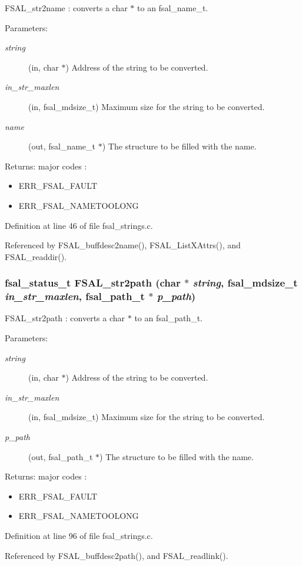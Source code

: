 FSAL\_\-str2name : converts a char $\ast$ to an fsal\_\-name\_\-t.

\begin{Desc}
\item[Parameters:]
\begin{description}
\item[{\em string}](in, char $\ast$) Address of the string to be converted. \item[{\em in\_\-str\_\-maxlen}](in, fsal\_\-mdsize\_\-t) Maximum size for the string to be converted. \item[{\em name}](out, fsal\_\-name\_\-t $\ast$) The structure to be filled with the name.\end{description}
\end{Desc}
\begin{Desc}
\item[Returns:]major codes :\begin{itemize}
\item ERR\_\-FSAL\_\-FAULT\item ERR\_\-FSAL\_\-NAMETOOLONG \end{itemize}
\end{Desc}


Definition at line 46 of file fsal\_\-strings.c.

Referenced by FSAL\_\-buffdesc2name(), FSAL\_\-List\-XAttrs(), and FSAL\_\-readdir().
\subsubsection{\setlength{\rightskip}{0pt plus 5cm}fsal\_\-status\_\-t FSAL\_\-str2path (char $\ast$ {\em string}, fsal\_\-mdsize\_\-t {\em in\_\-str\_\-maxlen}, fsal\_\-path\_\-t $\ast$ {\em p\_\-path})}\label{group__FSALNameFunctions_ga1}


FSAL\_\-str2path : converts a char $\ast$ to an fsal\_\-path\_\-t.

\begin{Desc}
\item[Parameters:]
\begin{description}
\item[{\em string}](in, char $\ast$) Address of the string to be converted. \item[{\em in\_\-str\_\-maxlen}](in, fsal\_\-mdsize\_\-t) Maximum size for the string to be converted. \item[{\em p\_\-path}](out, fsal\_\-path\_\-t $\ast$) The structure to be filled with the name.\end{description}
\end{Desc}
\begin{Desc}
\item[Returns:]major codes :\begin{itemize}
\item ERR\_\-FSAL\_\-FAULT\item ERR\_\-FSAL\_\-NAMETOOLONG \end{itemize}
\end{Desc}


Definition at line 96 of file fsal\_\-strings.c.

Referenced by FSAL\_\-buffdesc2path(), and FSAL\_\-readlink().
